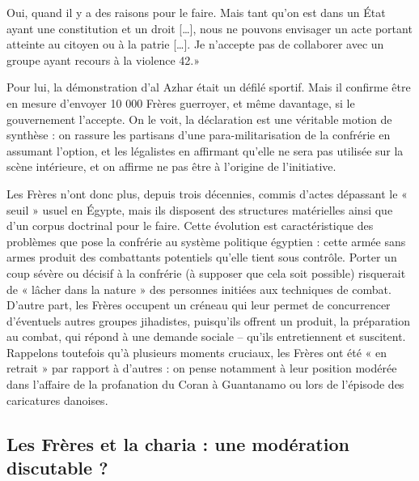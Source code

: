 Oui, quand il y a des raisons pour le faire. Mais tant qu'on est dans un
État ayant une constitution et un droit {[}\ldots{]}, nous ne pouvons
envisager un acte portant atteinte au citoyen ou à la patrie
{[}\ldots{]}. Je n'accepte pas de collaborer avec un groupe ayant
recours à la violence 42.»

Pour lui, la démonstration d'al Azhar était un défilé sportif. Mais il
confirme être en mesure d'envoyer 10 000 Frères guerroyer, et même
davantage, si le gouvernement l'accepte. On le voit, la déclaration est
une véritable motion de synthèse : on rassure les partisans d'une
para-militarisation de la confrérie en assumant l'option, et les
légalistes en affirmant qu'elle ne sera pas utilisée sur la scène
intérieure, et on affirme ne pas être à l'origine de l'initiative.

Les Frères n'ont donc plus, depuis trois décennies, commis d'actes
dépassant le « seuil » usuel en Égypte, mais ils disposent des
structures matérielles ainsi que d'un corpus doctrinal pour le faire.
Cette évolution est caractéristique des problèmes que pose la confrérie
au système politique égyptien : cette armée sans armes produit des
combattants potentiels qu'elle tient sous contrôle. Porter un coup
sévère ou décisif à la confrérie (à supposer que cela soit possible)
risquerait de « lâcher dans la nature » des personnes initiées aux
techniques de combat. D'autre part, les Frères occupent un créneau qui
leur permet de concurrencer d'éventuels autres groupes jihadistes,
puisqu'ils offrent un produit, la préparation au combat, qui répond à
une demande sociale -- qu'ils entretiennent et suscitent. Rappelons
toutefois qu'à plusieurs moments cruciaux, les Frères ont été « en
retrait » par rapport à d'autres : on pense notamment à leur position
modérée dans l'affaire de la profanation du Coran à Guantanamo ou lors
de l'épisode des caricatures danoises.
 

\hypertarget{les-fruxe8res-et-la-charia-une-moduxe9ration-discutable}{%
\subsection{Les Frères et la charia : une modération discutable
?}\label{les-fruxe8res-et-la-charia-une-moduxe9ration-discutable}}

